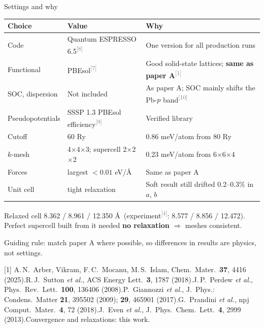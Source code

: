 \documentclass[aspectratio=169,10pt]{beamer}
\newcommand{\cit}[1]{\textsuperscript{\textcolor{gray}{[#1]}}}
\newcommand{\refs}[1]{\par\vfill\begingroup\tiny\color{gray}\raggedright #1\par\endgroup}
\newcommand{\RA}{[1] A.\,N.~Arber, Vikram, F.\,C.~Mocanu, M.\,S.~Islam, Chem.\ Mater.\ \textbf{37}, 4416 (2025).}
\newcommand{\RD}{[4] R.\,J.~Sutton \emph{et al.}, ACS Energy Lett.\ \textbf{3}, 1787 (2018).}
\newcommand{\RI}{[7] J.\,P.~Perdew \emph{et al.}, Phys.\ Rev.\ Lett.\ \textbf{100}, 136406 (2008).}
\newcommand{\RJ}{[8] P.~Giannozzi \emph{et al.}, J.\ Phys.: Condens.\ Matter \textbf{21}, 395502 (2009); \textbf{29}, 465901 (2017).}
\newcommand{\RK}{[9] G.~Prandini \emph{et al.}, npj Comput.\ Mater.\ \textbf{4}, 72 (2018).}
\newcommand{\RL}{[10] J.~Even \emph{et al.}, J.\ Phys.\ Chem.\ Lett.\ \textbf{4}, 2999 (2013).}
\begin{document}
\begin{frame}{Settings and why}
  \footnotesize
  \begin{tabular}{lll}
    \toprule
    Choice & Value & Why \\
    \midrule
    Code & Quantum ESPRESSO 6.5\cit{8} & One version for all production runs \\
    Functional & PBEsol\cit{7} & Good solid-state lattices; \textbf{same as paper A}\cit{1} \\
    SOC, dispersion & Not included & As paper A; SOC mainly shifts the Pb-$p$ band\cit{10} \\
    Pseudopotentials & SSSP 1.3 PBEsol efficiency\cit{9} & Verified library \\
    Cutoff & 60 Ry & 0.86 meV/atom from 80 Ry \\
    $k$-mesh & 4$\times$4$\times$3; supercell 2$\times$2$\times$2 & 0.23 meV/atom from 6$\times$6$\times$4 \\
    Forces & largest $< 0.01$ eV/\AA & Same as paper A \\
    Unit cell & tight relaxation & Soft result still drifted 0.2--0.3\% in $a$, $b$ \\
    \bottomrule
  \end{tabular}

  \vspace{0.5em}
  Relaxed cell 8.362 / 8.961 / 12.350 \AA\ (experiment\cit{4}: 8.577 / 8.856 / 12.472). Perfect supercell built from it needed \textbf{no relaxation} $\Rightarrow$ meshes consistent.

  \vspace{0.3em}
  Guiding rule: \alert{match paper A where possible}, so differences in results are physics, not settings.
  \refs{\RA\quad \RD\quad \RI\quad \RJ\quad \RK\quad \RL\quad Convergence and relaxations: this work.}
\end{frame}
\end{document}

